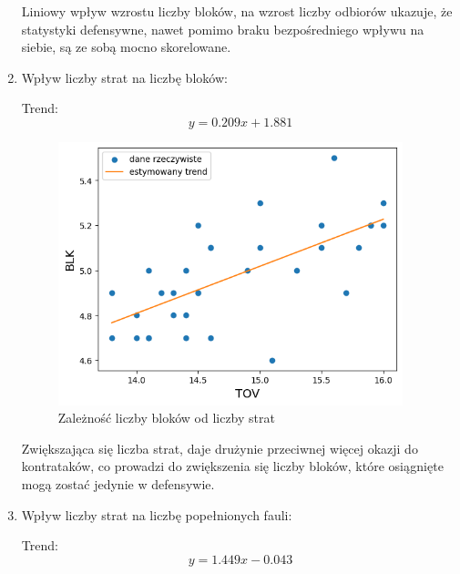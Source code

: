 \documentclass{article}
\begin{document}
\begin{enumerate}
        Liniowy wpływ wzrostu liczby bloków, na wzrost liczby odbiorów ukazuje, że statystyki defensywne, nawet pomimo braku bezpośredniego wpływu na siebie, są ze sobą mocno skorelowane.
\newpage 
        \item Wpływ liczby strat na liczbę bloków:
        
        
        Trend:\begin{equation} y = 0.209x + 1.881 \end{equation}
        
            \begin{figure}[H]
                \centering
                \includegraphics[width=10cm]{wykres_zaleznosci_BLK_od_TOV.png}
                \caption{Zależność liczby bloków od liczby strat}
                \label{fig:wykres_zaleznosci_BLK_od_TOV}
            \end{figure}

        Zwiększająca się liczba strat, daje drużynie przeciwnej więcej okazji do kontrataków, co prowadzi do zwiększenia się liczby bloków, które osiągnięte mogą zostać jedynie w defensywie.
\newpage 
        \item Wpływ liczby strat na liczbę popełnionych fauli:
        
        Trend:\begin{equation} y = 1.449x - 0.043 \end{equation}
        

\end{enumerate}
\end{document}
